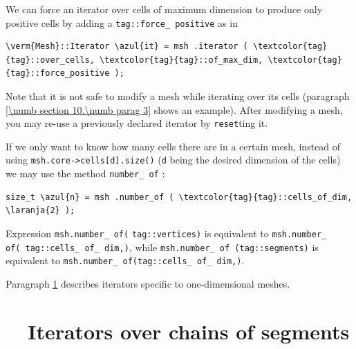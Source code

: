 We can force an iterator over cells of maximum dimension to produce only positive cells
by adding a {\small\tt \textcolor{tag}{tag}::force\_\,positive} as in

\begin{Verbatim}[commandchars=\\\{\},formatcom=\small\tt,
   baselinestretch=0.94,framesep=2mm                      ]
   \verm{Mesh}::Iterator \azul{it} = msh .iterator ( \textcolor{tag}{tag}::over_cells, \textcolor{tag}{tag}::of_max_dim, \textcolor{tag}{tag}::force_positive );
\end{Verbatim}

Note that it is not safe to modify a mesh while iterating over its cells
(paragraph \ref{\numb section 10.\numb parag 3} shows an example).
After modifying a mesh, you may re-use a previously declared iterator by {\small\tt reset}ting it.

If we only want to know how many cells there are in a certain mesh,
instead of using {\small\tt msh.core->cells[d].size()} ({\small\tt d} being the desired
dimension of the cells) we may use the method {\small\tt number\_\,of} :

\begin{Verbatim}[commandchars=\\\{\},formatcom=\small\tt,
   baselinestretch=0.94,framesep=2mm                      ]
   size_t \azul{n} = msh .number_of ( \textcolor{tag}{tag}::cells_of_dim, \laranja{2} );
\end{Verbatim}

\noindent Expression {\small\tt msh.number\_\,of}\hskip1pt{\small\tt (}\hskip1pt
{\small\tt \textcolor{tag}{tag}::vertices}\hskip1pt{\small\tt )} is equivalent to
\hbox{{\small\tt msh.number\_\,of}\hskip1pt{\small\tt (}\hskip1pt
{\small\tt \textcolor{tag}{tag}::cells\_\,of\_\,dim,}\hskip1pt{\small\tt{}}\hskip1pt{\small\tt )}},
while {\small\tt msh.number\_\,of}\hskip2pt{\small\tt
(}\hskip2pt{\small\tt \textcolor{tag}{tag}::segments}\hskip2pt{\small\tt )} is equivalent to
{\small\tt msh.number\_\,of}\hskip2pt{\small\tt (}\hskip2pt{\small\tt \textcolor{tag}{tag}::cells\_\,of\_\,dim,}\hskip2pt{\small\tt{}}\hskip2pt{\small\tt )}.

Paragraph \ref{\numb section 9.\numb parag 4} describes iterators specific to one-dimensional
meshes.


\section{~~Iterators over chains of segments}\label{\numb section 9.\numb parag 4}

